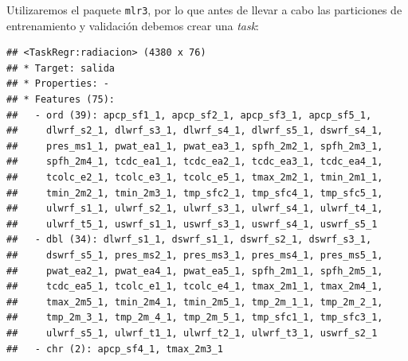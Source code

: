 \documentclass[
  11pt,
  a4paper,
]{article}
\newenvironment{Shaded}{\begin{snugshade}}{\end{snugshade}}
\newcommand{\AttributeTok}[1]{\textcolor[rgb]{0.77,0.63,0.00}{#1}}
\newcommand{\FunctionTok}[1]{\textcolor[rgb]{0.00,0.00,0.00}{#1}}
\newcommand{\NormalTok}[1]{#1}
\newcommand{\OtherTok}[1]{\textcolor[rgb]{0.56,0.35,0.01}{#1}}
\newcommand{\SpecialCharTok}[1]{\textcolor[rgb]{0.00,0.00,0.00}{#1}}
\newcommand{\StringTok}[1]{\textcolor[rgb]{0.31,0.60,0.02}{#1}}
\begin{document}
Utilizaremos el paquete \texttt{mlr3}, por lo que antes de llevar a cabo
las particiones de entrenamiento y validación debemos crear una
\emph{task}:

\begin{Shaded}
\end{Shaded}

\begin{verbatim}
## <TaskRegr:radiacion> (4380 x 76)
## * Target: salida
## * Properties: -
## * Features (75):
##   - ord (39): apcp_sf1_1, apcp_sf2_1, apcp_sf3_1, apcp_sf5_1,
##     dlwrf_s2_1, dlwrf_s3_1, dlwrf_s4_1, dlwrf_s5_1, dswrf_s4_1,
##     pres_ms1_1, pwat_ea1_1, pwat_ea3_1, spfh_2m2_1, spfh_2m3_1,
##     spfh_2m4_1, tcdc_ea1_1, tcdc_ea2_1, tcdc_ea3_1, tcdc_ea4_1,
##     tcolc_e2_1, tcolc_e3_1, tcolc_e5_1, tmax_2m2_1, tmin_2m1_1,
##     tmin_2m2_1, tmin_2m3_1, tmp_sfc2_1, tmp_sfc4_1, tmp_sfc5_1,
##     ulwrf_s1_1, ulwrf_s2_1, ulwrf_s3_1, ulwrf_s4_1, ulwrf_t4_1,
##     ulwrf_t5_1, uswrf_s1_1, uswrf_s3_1, uswrf_s4_1, uswrf_s5_1
##   - dbl (34): dlwrf_s1_1, dswrf_s1_1, dswrf_s2_1, dswrf_s3_1,
##     dswrf_s5_1, pres_ms2_1, pres_ms3_1, pres_ms4_1, pres_ms5_1,
##     pwat_ea2_1, pwat_ea4_1, pwat_ea5_1, spfh_2m1_1, spfh_2m5_1,
##     tcdc_ea5_1, tcolc_e1_1, tcolc_e4_1, tmax_2m1_1, tmax_2m4_1,
##     tmax_2m5_1, tmin_2m4_1, tmin_2m5_1, tmp_2m_1_1, tmp_2m_2_1,
##     tmp_2m_3_1, tmp_2m_4_1, tmp_2m_5_1, tmp_sfc1_1, tmp_sfc3_1,
##     ulwrf_s5_1, ulwrf_t1_1, ulwrf_t2_1, ulwrf_t3_1, uswrf_s2_1
##   - chr (2): apcp_sf4_1, tmax_2m3_1
\end{verbatim}

\begin{Shaded}
\end{Shaded}
\end{document}
